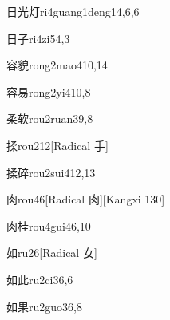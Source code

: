 \begin{verbete}{日光灯}{ri4guang1deng1}{4,6,6}
\end{verbete}

\begin{verbete}{日子}{ri4zi5}{4,3}
\end{verbete}

\begin{verbete}{容貌}{rong2mao4}{10,14}
\end{verbete}

\begin{verbete}{容易}{rong2yi4}{10,8}
\end{verbete}

\begin{verbete}{柔软}{rou2ruan3}{9,8}
\end{verbete}

\begin{verbete}{揉}{rou2}{12}[Radical 手]
\end{verbete}

\begin{verbete}{揉碎}{rou2sui4}{12,13}
\end{verbete}

\begin{verbete}{肉}{rou4}{6}[Radical 肉][Kangxi 130]
\end{verbete}

\begin{verbete}{肉桂}{rou4gui4}{6,10}
\end{verbete}

\begin{verbete}{如}{ru2}{6}[Radical 女]
\end{verbete}

\begin{verbete}{如此}{ru2ci3}{6,6}
\end{verbete}

\begin{verbete}{如果}{ru2guo3}{6,8}
\end{verbete}

